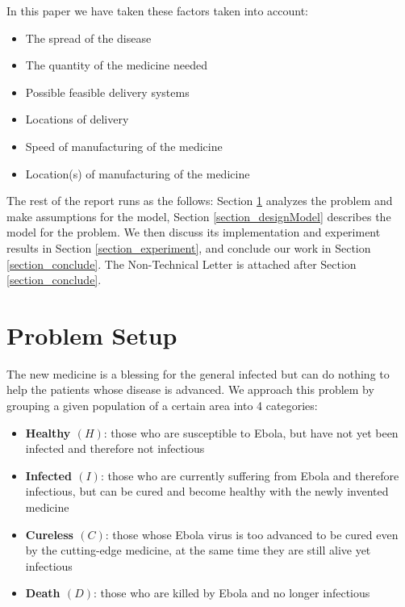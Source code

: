 \documentclass[12pt,a4paper,titlepage]{article}
\begin{document}
In this paper we have taken these factors taken into account:

\begin{itemize}
  \item The spread of the disease
  \item The quantity of the medicine needed
  \item Possible feasible delivery systems
  \item Locations of delivery
  \item Speed of manufacturing of the medicine
  \item Location(s) of manufacturing of the medicine
\end{itemize}

The rest of the report runs as the follows: Section \ref{section_probSet} analyzes the problem and make assumptions for the model,  Section \ref{section_designModel} describes the model for the problem. We then discuss its implementation and experiment results in Section \ref{section_experiment}, and conclude our work in Section \ref{section_conclude}. The Non-Technical Letter is attached after Section \ref{section_conclude}.

\section{Problem Setup}
\label{section_probSet}

The new medicine is a blessing for the general infected but can do nothing to help the patients whose disease is advanced. We approach this problem by grouping a given population of a certain area into 4 categories: 
\begin{itemize}
	\item \textbf{Healthy $(H)$}: those who are susceptible to Ebola, but have not yet been infected and therefore not infectious
	\item \textbf{Infected $(I)$}: those who are currently suffering from Ebola and therefore infectious, but can be cured and become healthy with the newly invented medicine 
	\item \textbf{Cureless $(C)$}: those whose Ebola virus is too advanced to be cured even by the cutting-edge medicine, at the same time they are still alive yet infectious 
	\item \textbf{Death $(D)$}: those who are killed by Ebola and no longer infectious 
\end{itemize}
\end{document}
